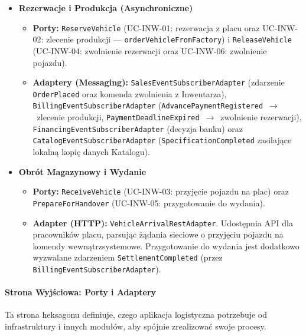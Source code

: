 \begin{itemize}
    \item \textbf{Rezerwacje i Produkcja (Asynchroniczne)}
    \begin{itemize}
        \item \textbf{Porty:} \texttt{ReserveVehicle} (UC-INW-01: rezerwacja z placu oraz UC-INW-02: zlecenie produkcji — \texttt{orderVehicleFromFactory}) i \texttt{ReleaseVehicle} (UC-INW-04: zwolnienie rezerwacji oraz UC-INW-06: zwolnienie pojazdu).
        \item \textbf{Adaptery (Messaging):} \texttt{SalesEventSubscriberAdapter} (zdarzenie \texttt{OrderPlaced} oraz komenda zwolnienia z Inwentarza), \texttt{BillingEventSubscriberAdapter} (\texttt{AdvancePaymentRegistered}~$\rightarrow$~zlecenie produkcji, \texttt{PaymentDeadlineExpired}~$\rightarrow$~zwolnienie rezerwacji), \texttt{FinancingEventSubscriberAdapter} (decyzja banku) oraz \texttt{CatalogEventSubscriberAdapter} (\texttt{SpecificationCompleted} zasilające lokalną kopię danych Katalogu).
    \end{itemize}

    \item \textbf{Obrót Magazynowy i Wydanie}
    \begin{itemize}
        \item \textbf{Porty:} \texttt{ReceiveVehicle} (UC-INW-03: przyjęcie pojazdu na plac) oraz \texttt{PrepareForHandover} (UC-INW-05: przygotowanie do wydania).
        \item \textbf{Adapter (HTTP):} \texttt{VehicleArrivalRestAdapter}. Udostępnia API dla pracowników placu, parsując żądania sieciowe o przyjęciu pojazdu na komendy wewnątrzsystemowe. Przygotowanie do wydania jest dodatkowo wyzwalane zdarzeniem \texttt{SettlementCompleted} (przez \texttt{BillingEventSubscriberAdapter}).
    \end{itemize}
\end{itemize}

\paragraph{Strona Wyjściowa: Porty i Adaptery} 
Ta strona heksagonu definiuje, czego aplikacja logistyczna potrzebuje od infrastruktury i innych modułów, aby spójnie zrealizować swoje procesy.

